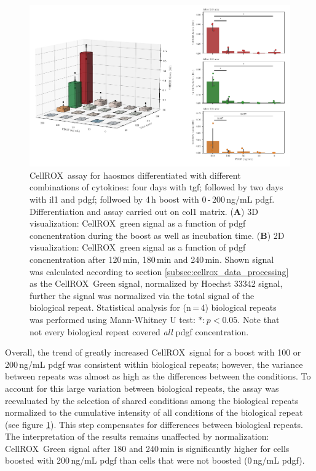     \begin{figure}[h!]
    \capstart
        \centering
    	\includegraphics{Abbildung/CellROX_titration_norm.pdf}
    	\begin{minipage}{\captionwidth}
    		\caption[cellROX_titration_norm]{ \newline
            CellROX\texttrademark~assay for \acp{haosmc} differentiated with different combinations of cytokines: four days with \ac{tgf}; followed by two days with \ac{il1} and \ac{pdgf}; follwoed by 4\,h boost with 0\,-\,200\,ng/mL \ac{pdgf}. Differentiation and assay carried out on \ac{col1} matrix.
            (\textbf{A}) 3D visualization: CellROX\texttrademark~green signal as a function of \ac{pdgf} concnentration during the boost as well as incubation time.
            (\textbf{B}) 2D visualization: CellROX\texttrademark~green signal as a function of \ac{pdgf} concnentration after 120\,min, 180\,min and 240\,min.
            Shown signal was calculated according to section \ref{subsec:cellrox_data_processing} as the CellROX\texttrademark~Green signal, normalized by Hoechst 33342 signal, further the signal was normalized via the total signal of the biological repeat. Statistical analysis for (n\,=\,4) biological repeats was performed using Mann-Whitney U test: $*: p < 0.05$. Note that not every biological repeat covered \textit{all} \ac{pdgf} concentration.}
    		\label{fig:cellROX_titration_norm}
    	\end{minipage}
    \end{figure}

    Overall, the trend of greatly increased CellROX\texttrademark~signal for a boost with 100 or 200\,ng/mL \ac{pdgf} was consistent within biological repeats; however, the variance between repeats was almost as high as the differences between the conditions. To account for this large variation between biological repeats, the assay was reevaluated by the selection of shared conditions among the biological repeats normalized to the cumulative intensity of all conditions of the biological repeat (see figure \ref{fig:cellROX_titration_norm}). This step compensates for differences between biological repeats. The interpretation of the results remains unaffected by normalization: CellROX\texttrademark~Green signal after 180 and 240\,min is significantly higher for cells boosted with 200\,ng/mL \ac{pdgf} than cells that were not boosted (0\,ng/mL \ac{pdgf}).

